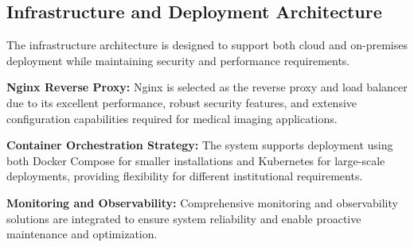\subsection{Infrastructure and Deployment Architecture}

The infrastructure architecture is designed to support both cloud and on-premises deployment while maintaining security and performance requirements.

\textbf{Nginx Reverse Proxy:} Nginx is selected as the reverse proxy and load balancer due to its excellent performance, robust security features, and extensive configuration capabilities required for medical imaging applications.

\textbf{Container Orchestration Strategy:} The system supports deployment using both Docker Compose for smaller installations and Kubernetes for large-scale deployments, providing flexibility for different institutional requirements.

\textbf{Monitoring and Observability:} Comprehensive monitoring and observability solutions are integrated to ensure system reliability and enable proactive maintenance and optimization. 